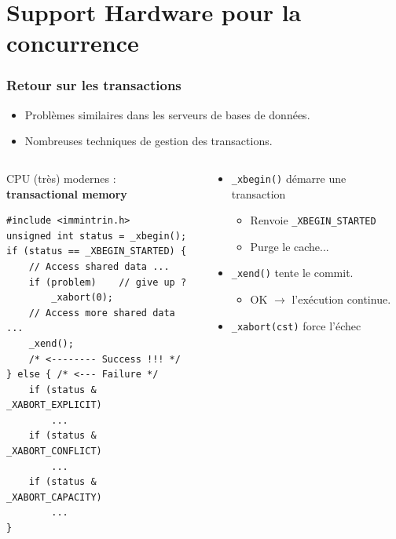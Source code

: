 \documentclass[xcolor={x11names,svgnames}]{beamer}
\begin{document}

\section{Support Hardware pour la concurrence}

\begin{frame}[fragile, label=rtm]
  \frametitle{Retour sur les transactions}

  \begin{itemize}
  \item Problèmes similaires dans les serveurs de bases de données.
  \item Nombreuses techniques de gestion des transactions.
  \end{itemize}

  \begin{columns}
    \begin{column}{0.47\textwidth}
  \begin{alertblock}{CPU (très) modernes :\\ \textbf{transactional memory}}
\begin{verbatim}
#include <immintrin.h>
unsigned int status = _xbegin();
if (status == _XBEGIN_STARTED) {
    // Access shared data ...
    if (problem)    // give up ?
        _xabort(0); 
    // Access more shared data ...
    _xend();
    /* <-------- Success !!! */
} else { /* <--- Failure */
    if (status & _XABORT_EXPLICIT)
        ...
    if (status & _XABORT_CONFLICT)
        ...    
    if (status & _XABORT_CAPACITY)
        ...
}
\end{verbatim}
  \end{alertblock}
\end{column}
\begin{column}{0.63\textwidth}
  \begin{itemize}
  \item \verb|_xbegin()| démarre une transaction
    \begin{itemize}
    \item Renvoie \verb|_XBEGIN_STARTED|
    \item Purge le cache...
    \end{itemize}
  \item \verb|_xend()| tente le \og commit\fg{}.
    \begin{itemize}
    \item OK $\rightarrow$ l'exécution continue.
    \end{itemize}
  \item \verb|_xabort(cst)| force l'échec


\end{itemize}
\end{column}
\end{columns}
\end{frame}
\end{document}

